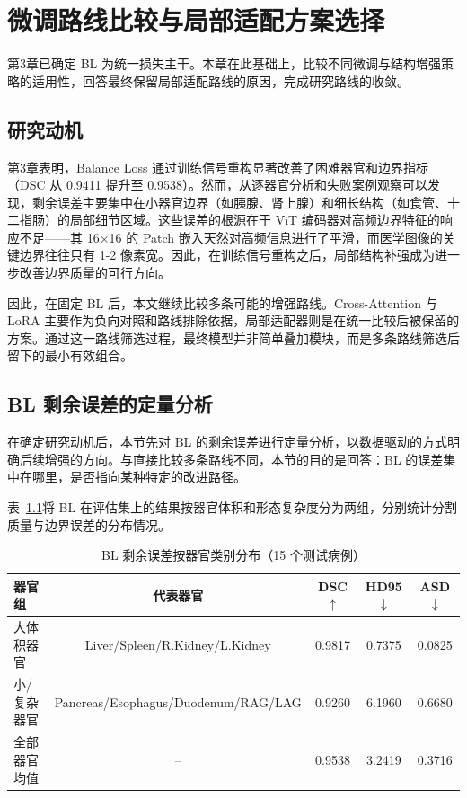 \chapter{微调路线比较与局部适配方案选择}

第3章已确定 BL 为统一损失主干。本章在此基础上，比较不同微调与结构增强策略的适用性，回答最终保留局部适配路线的原因，完成研究路线的收敛。

\section{研究动机}

第3章表明，Balance Loss 通过训练信号重构显著改善了困难器官和边界指标（DSC 从 0.9411 提升至 0.9538）。然而，从逐器官分析和失败案例观察可以发现，剩余误差主要集中在小器官边界（如胰腺、肾上腺）和细长结构（如食管、十二指肠）的局部细节区域。这些误差的根源在于 ViT 编码器对高频边界特征的响应不足——其 16×16 的 Patch 嵌入天然对高频信息进行了平滑，而医学图像的关键边界往往只有 1-2 像素宽。因此，在训练信号重构之后，局部结构补强成为进一步改善边界质量的可行方向。

因此，在固定 BL 后，本文继续比较多条可能的增强路线。Cross-Attention 与 LoRA 主要作为负向对照和路线排除依据，局部适配器则是在统一比较后被保留的方案。通过这一路线筛选过程，最终模型并非简单叠加模块，而是多条路线筛选后留下的最小有效组合。

\section{BL 剩余误差的定量分析}

在确定研究动机后，本节先对 BL 的剩余误差进行定量分析，以数据驱动的方式明确后续增强的方向。与直接比较多条路线不同，本节的目的是回答：BL 的误差集中在哪里，是否指向某种特定的改进路径。

表~\ref{tab:bl_error_analysis}将 BL 在评估集上的结果按器官体积和形态复杂度分为两组，分别统计分割质量与边界误差的分布情况。

\begin{table}[htbp]
  \centering
  \caption{BL 剩余误差按器官类别分布（15 个测试病例）}
  \label{tab:bl_error_analysis}
  \small
  \begin{tabular}{lcccc}
    \hline
    器官组 & 代表器官 & DSC $\uparrow$ & HD95 $\downarrow$ & ASD $\downarrow$ \\
    \hline
    大体积器官 & Liver/Spleen/R.Kidney/L.Kidney & 0.9817 & 0.7375 & 0.0825 \\
    小/复杂器官 & Pancreas/Esophagus/Duodenum/RAG/LAG & 0.9260 & 6.1960 & 0.6680 \\
    \hline
    全部器官均值 & -- & 0.9538 & 3.2419 & 0.3716 \\
    \hline
  \end{tabular}
\end{table}

